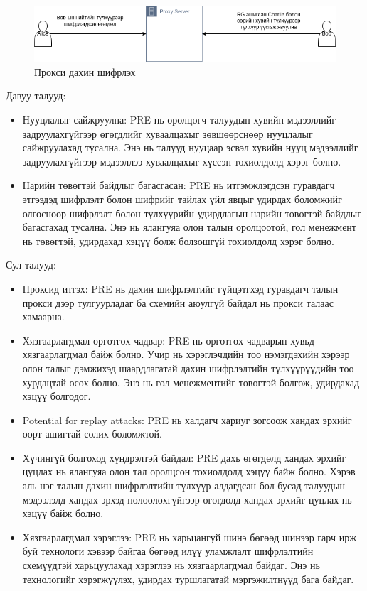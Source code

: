 \begin{figure}[ht]
\centering
\includegraphics[scale=0.5]{Figures/PRE.drawio.png}
\caption[Proxy Re-encryption scheme]{Прокси дахин шифрлэх}
\label{fig:PRE_Scheme}
\end{figure}

Давуу талууд:
\begin{itemize}
    \item Нууцлалыг сайжруулна: PRE нь оролцогч талуудын хувийн мэдээллийг задруулахгүйгээр өгөгдлийг хуваалцахыг зөвшөөрснөөр нууцлалыг сайжруулахад тусална. Энэ нь талууд нууцаар эсвэл хувийн нууц мэдээллийг задруулахгүйгээр мэдээллээ хуваалцахыг хүссэн тохиолдолд хэрэг болно.
    \item Нарийн төвөгтэй байдлыг багасгасан: PRE нь итгэмжлэгдсэн гуравдагч этгээдэд шифрлэлт болон шифрийг тайлах үйл явцыг удирдах боломжийг олгосноор шифрлэлт болон түлхүүрийн удирдлагын нарийн төвөгтэй байдлыг багасгахад тусална. Энэ нь ялангуяа олон талын оролцоотой, гол менежмент нь төвөгтэй, удирдахад хэцүү болж болзошгүй тохиолдолд хэрэг болно.
\end{itemize}

Сул талууд:
\begin{itemize}
    \item Проксид итгэх: PRE нь дахин шифрлэлтийг гүйцэтгхэд гуравдагч талын прокси дээр тулгуурладаг ба схемийн аюулгүй байдал нь прокси талаас хамаарна.
    \item Хязгаарлагдмал өргөтгөх чадвар: PRE нь өргөтгөх чадварын хувьд хязгаарлагдмал байж болно. Учир нь хэрэглэчдийн тоо нэмэгдэхийн хэрээр олон талыг дэмжихэд шаардлагатай дахин шифрлэлтийн түлхүүрүүдийн тоо хурдацтай өсөх болно. Энэ нь гол менежментийг төвөгтэй болгож, удирдахад хэцүү болгодог.
    \item Potential for replay attacks: PRE нь халдагч хариуг зогсоож хандах эрхийг өөрт ашигтай солих боломжтой. 
    \item Хүчингүй болгоход хүндрэлтэй байдал: PRE дахь өгөгдөлд хандах эрхийг цуцлах нь ялангуяа олон тал оролцсон тохиолдолд хэцүү байж болно. Хэрэв аль нэг талын дахин шифрлэлтийн түлхүүр алдагдсан бол бусад талуудын мэдээлэлд хандах эрхэд нөлөөлөхгүйгээр өгөгдөлд хандах эрхийг цуцлах нь хэцүү байж болно.
    \item Хязгаарлагдмал хэрэглээ: PRE нь харьцангуй шинэ бөгөөд шинээр гарч ирж буй технологи хэвээр байгаа бөгөөд илүү уламжлалт шифрлэлтийн схемүүдтэй харьцуулахад хэрэглээ нь хязгаарлагдмал байдаг. Энэ нь технологийг хэрэгжүүлэх, удирдах туршлагатай мэргэжилтнүүд бага байдаг.
\end{itemize}

